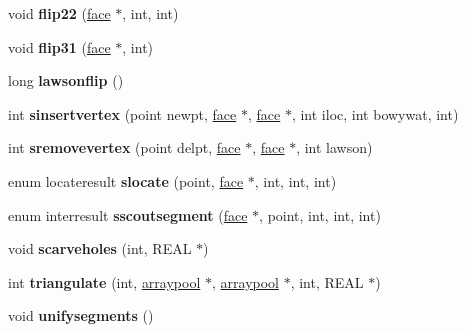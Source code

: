 \begin{DoxyCompactItemize}
void {\bfseries flip22} (\hyperlink{classtetgenmesh_1_1face}{face} $\ast$, int, int)
\item 
\mbox{\label{classtetgenmesh_a3db30cb237ac5cbcda3ac70a1ea31666}} 
void {\bfseries flip31} (\hyperlink{classtetgenmesh_1_1face}{face} $\ast$, int)
\item 
\mbox{\label{classtetgenmesh_acf60f3a43f8b907d95623b42a88ae968}} 
long {\bfseries lawsonflip} ()
\item 
\mbox{\label{classtetgenmesh_ad48cec74c7fbcf66ebd312661da5d0bc}} 
int {\bfseries sinsertvertex} (point newpt, \hyperlink{classtetgenmesh_1_1face}{face} $\ast$, \hyperlink{classtetgenmesh_1_1face}{face} $\ast$, int iloc, int bowywat, int)
\item 
\mbox{\label{classtetgenmesh_a7fc2b1bb2e54a5e013edc3e23bd0523b}} 
int {\bfseries sremovevertex} (point delpt, \hyperlink{classtetgenmesh_1_1face}{face} $\ast$, \hyperlink{classtetgenmesh_1_1face}{face} $\ast$, int lawson)
\item 
\mbox{\label{classtetgenmesh_ac3501a618bd4f4102d0f4722c7de3926}} 
enum locateresult {\bfseries slocate} (point, \hyperlink{classtetgenmesh_1_1face}{face} $\ast$, int, int, int)
\item 
\mbox{\label{classtetgenmesh_acc36e5d02b6f2c8ced8a9be102b41eaf}} 
enum interresult {\bfseries sscoutsegment} (\hyperlink{classtetgenmesh_1_1face}{face} $\ast$, point, int, int, int)
\item 
\mbox{\label{classtetgenmesh_a2473a9f86cb5829968a01fdad0d3df7d}} 
void {\bfseries scarveholes} (int, R\+E\+AL $\ast$)
\item 
\mbox{\label{classtetgenmesh_a2042ec0196b3f6427fc9b6e6e3165919}} 
int {\bfseries triangulate} (int, \hyperlink{classtetgenmesh_1_1arraypool}{arraypool} $\ast$, \hyperlink{classtetgenmesh_1_1arraypool}{arraypool} $\ast$, int, R\+E\+AL $\ast$)
\item 
\mbox{\label{classtetgenmesh_adcb0e0e582808c23829b42708a7596dc}} 
void {\bfseries unifysegments} ()
\item 

\end{DoxyCompactItemize}
